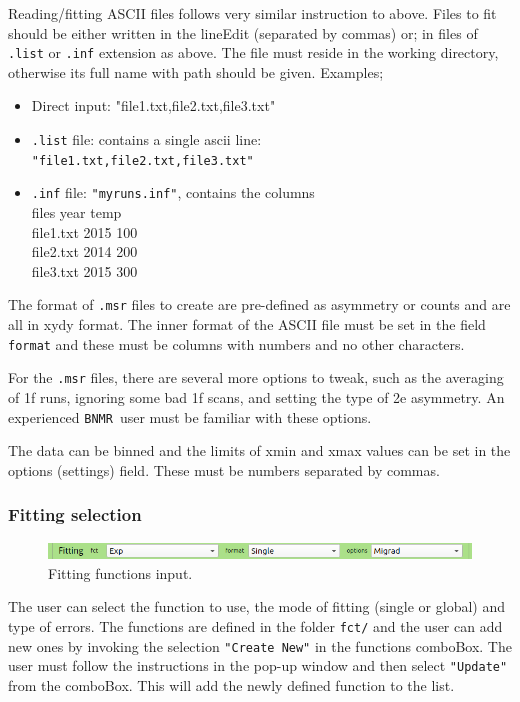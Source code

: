 \documentclass[10pt,letterpaper,oneside]{article}
\newcommand{\bnmrg}{\texttt{BNMR}}
\begin{document}
 Reading/fitting ASCII files follows very similar instruction to above. 
Files to fit should be either written in the lineEdit (separated by commas) or; in files of \verb+.list+ or \verb+.inf+ extension as above. The file must reside in the working directory, otherwise its full name with path should be given. Examples;
\begin{itemize}
\item Direct input: "file1.txt,file2.txt,file3.txt"
\item \verb+.list+ file: contains a single ascii line:\\ \verb+"file1.txt,file2.txt,file3.txt"+
\item \verb+.inf+ file: \verb+"myruns.inf"+, contains the columns\\
files year temp\\
file1.txt 2015 100\\
file2.txt 2014 200\\
file3.txt 2015 300\\
\end{itemize}

The format of  \verb+.msr+ files to create are pre-defined as asymmetry or counts and are all in xydy format. The inner format of the ASCII file must be set in the field \verb+format+ and these must be columns with numbers and no other characters. 

For the \verb+.msr+ files, there are several more options to tweak, such as the averaging of 1f runs, ignoring some bad 1f scans, and setting the type of 2e asymmetry. An experienced \bnmrg\ user must be familiar with these options. 

The data can be binned and the limits of xmin and xmax values can be set in the options (settings) field. These must be numbers separated by commas.




\subsubsection{Fitting selection}
\begin{figure}[h]
\includegraphics[width=\textwidth]{analyze-fct.png}
 \caption{Fitting functions input.}
 \label{fig-mag}
 \end{figure}

The user can select the function to use, the mode of fitting (single or global) and type of errors. The functions are defined in the folder \verb+fct/+ and the user can add new ones by invoking the selection \verb+"Create New"+ in the functions comboBox. The user must follow the instructions in the pop-up window and then select \verb+"Update"+ from the comboBox. This will add the newly defined function to the list. 
\end{document}
